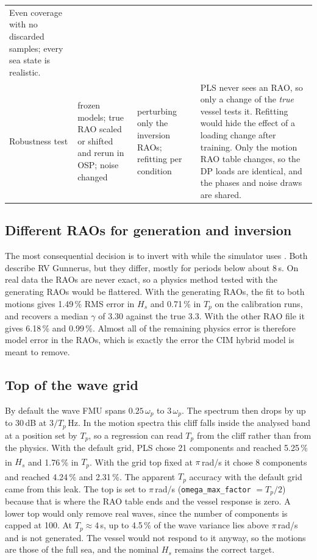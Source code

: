\documentclass[11pt,a4paper]{article}
\newcommand{\Hs}{H_{s}}
\newcommand{\Tp}{T_{p}}
\newcommand{\pct}[1]{#1\,\%}
\newcommand{\dagnote}{\textsuperscript{\dag}}
\begin{document}
{\begin{longtable}{@{}>{\raggedright\arraybackslash}p{2.5cm}>{\raggedright\arraybackslash}p{3.4cm}>{\raggedright\arraybackslash}p{2.6cm}>{\raggedright\arraybackslash}p{6.4cm}@{}}
    Even coverage with no discarded samples; every sea state is realistic. \\
  Robustness test & frozen models; true RAO scaled or shifted and rerun in OSP; noise changed &
    perturbing only the inversion RAOs; refitting per condition &
    PLS never sees an RAO, so only a change of the \emph{true} vessel tests it. Refitting would
    hide the effect of a loading change after training. Only the motion RAO table changes, so
    the DP loads are identical, and the phases and noise draws are shared. \\
\end{longtable}
}

\subsection{Different RAOs for generation and inversion}
\label{sec:dec_rao}

The most consequential decision is to invert with  while the
simulator uses . Both describe RV Gunnerus, but they differ, mostly for
periods below about 8\,s. On real data the RAOs are never exact, so a physics method tested
with the generating RAOs would be flattered. With the generating RAOs, the fit to both motions
gives \pct{1.49} RMS error in $\Hs$ and \pct{0.71} in $\Tp$ on the calibration runs, and
recovers a median $\gamma$ of 3.30 against the true 3.3. With the other RAO file it gives
\pct{6.18} and \pct{0.99}. Almost all of the remaining physics error is therefore model error in
the RAOs, which is exactly the error the CIM hybrid model is meant to remove.

\subsection{Top of the wave grid}
\label{sec:dec_grid}

By default the wave FMU spans $0.25\,\omega_p$ to $3\,\omega_p$. The spectrum then drops by up
to 30\,dB at $3/\Tp$\,Hz. In the motion spectra this cliff falls inside the analysed band at a
position set by $\Tp$, so a regression can read $\Tp$ from the cliff rather than from the
physics. With the default grid, PLS chose 21 components and reached \pct{5.25} in $\Hs$ and
\pct{1.76} in $\Tp$\dagnote. With the grid top fixed at $\pi$\,rad/s it chose 8 components and
reached \pct{4.24} and \pct{2.31}\dagnote. The apparent $\Tp$ accuracy with the default grid
came from this leak. The top is set to $\pi$\,rad/s (\texttt{omega\_max\_factor} $= \Tp/2$)
because that is where the RAO table ends and the vessel response is zero. A lower top would only
remove real waves, since the number of components is capped at 100. At $\Tp \approx 4$\,s, up to
\pct{4.5} of the wave variance lies above $\pi$\,rad/s and is not generated. The vessel would not
respond to it anyway, so the motions are those of the full sea, and the nominal $\Hs$ remains
the correct target.
\end{document}

